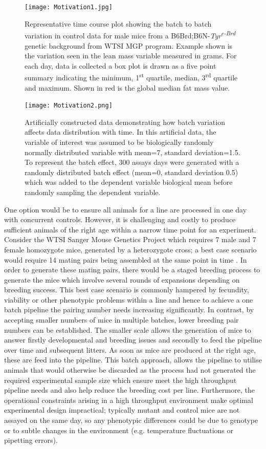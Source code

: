 \documentclass[12pt,a4paper]{article}
\begin{document}
\begin{figure}[!htpb]%
\centerline{\texttt{[image: Motivation1.jpg]}}
\caption{Representative time course plot showing the batch to batch variation in control data for male mice from a B6Brd;B6N-\textit{Tyr\textsuperscript{c-Brd}} genetic background from WTSI MGP program. Example shown is the variation seen in the lean mass variable measured in grams.   For each day, data is collected a box plot is drawn as a five point summary indicating the minimum, 1\textsuperscript{st} quartile, median, 3\textsuperscript{rd} quartile and maximum. Shown in red is the global median fat mass value.}\label{fig:001}
\end{figure}

\begin{figure}[!htpb]%
\centerline{\texttt{[image: Motivation2.png]}}
\caption{Artificially constructed data demonstrating how batch variation affects data distribution with time.  In this artificial data, the variable of interest was assumed to be biologically randomly normally distributed variable with mean=7, standard deviation=1.5. To represent the batch effect, 300 assays days were generated with a randomly distributed batch effect (mean=0, standard deviation 0.5) which was added to the dependent variable biological mean before randomly sampling the dependent variable. }\label{fig:002}
\end{figure}

One option would be to ensure all animals for a line are processed in one day with concurrent controls.  However, it is challenging and costly to produce sufficient animals of the right age within a narrow time point for an experiment.  Consider the WTSI Sanger Mouse Genetics Project which requires 7 male and 7 female homozygote mice, generated by a heterozygote cross; a best case scenario would require 14 mating pairs being assembled at the same point in time \cite{Pinkert}.  In order to generate these mating pairs, there would be a staged breeding process to generate the mice which involve several rounds of expansions depending on breeding success.  This best case scenario is commonly hampered by fecundity, viability or other phenotypic problems within a line and hence to achieve a one batch pipeline the pairing number needs increasing significantly.  In contrast, by accepting smaller numbers of mice in multiple batches, lower breeding pair numbers can be established.  The smaller scale allows the 
generation of mice to answer firstly developmental and breeding issues and secondly to feed the pipeline over time and subsequent litters.  As soon as mice are produced at the right age, these are feed into the pipeline.  This batch approach, allows the pipeline to utilise animals that would otherwise be discarded as the process had not generated the required experimental sample size which ensure meet the high throughput pipeline needs and also help reduce the breeding cost per line.  Furthermore, the operational constraints arising in a high throughput environment make optimal experimental design impractical; typically mutant and control mice are not assayed on the same day, so any phenotypic differences could be due to genotype or to subtle changes in the environment (e.g. temperature fluctuations or pipetting errors).  
 
\end{document}
